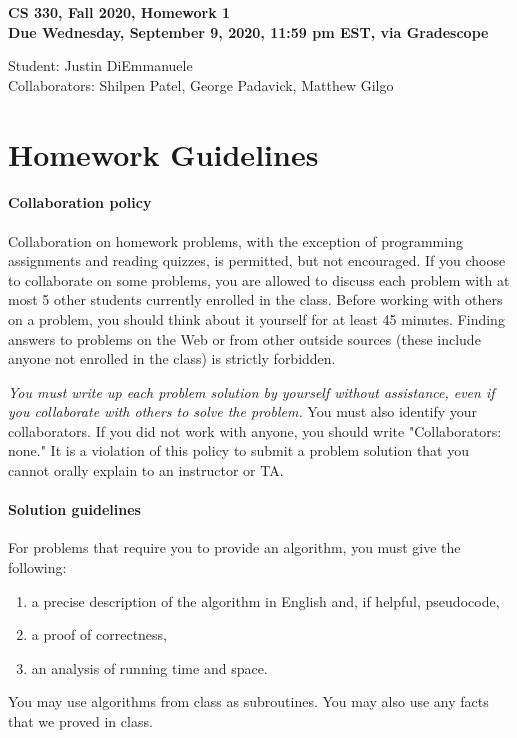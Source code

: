 \documentclass[11pt]{article}
\begin{document}
	
\begin{center}
\Large{\textbf{CS 330, Fall 2020, Homework 1 \\
Due Wednesday, September
  9, 2020, 11:59 pm EST, via Gradescope}}
\end{center}

\begin{center}
   Student: Justin DiEmmanuele \\
    Collaborators: Shilpen Patel, George Padavick, Matthew Gilgo
\end{center}


\section*{Homework Guidelines}


\paragraph{Collaboration policy} Collaboration on homework problems, with the exception of
programming assignments and reading quizzes, is permitted, but not encouraged.
If you
choose to collaborate on some problems, you are allowed to discuss
each problem with at most 5 other students currently enrolled in the
class.
Before working with others on a problem, you should think about it
yourself for at least 45 minutes. Finding answers to problems on the
Web or from other outside sources (these include anyone not enrolled
in the class) is strictly forbidden.

{\em You must write up each problem solution by yourself without
assistance, even if you collaborate with others to solve the
problem.} You must also identify your collaborators. If you did not
work with anyone, you should write "Collaborators: none." It is a
violation of this policy to submit a problem solution that you
cannot orally explain to an instructor or TA.

\paragraph{Solution guidelines} For problems that require you to provide an algorithm, you must give the following:
    \begin{enumerate}
\item  a precise description of the algorithm in English and, if helpful, pseudocode,
\item a proof of correctness,
\item an analysis of running time and space.
\end{enumerate}
You may use algorithms from class as subroutines. You may also use any facts that we proved in class.
\end{document}
